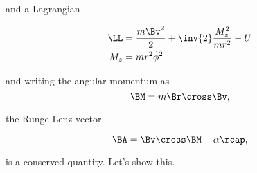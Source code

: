 and a Lagrangian

\begin{align}\label{eqn:RungeLenz:n}
\LL &= \frac{m \Bv^2}{2} + \inv{2} \frac{M_z^2}{m r^2} - U \\
M_z &= m r^2 \dot{\phi}^2
\end{align}

and writing the angular momentum as
\begin{equation}\label{eqn:RungeLenz:n}
\BM = m \Br \cross \Bv,
\end{equation}

the Runge-Lenz vector

\begin{equation}\label{eqn:RungeLenz:n}
\BA = \Bv \cross \BM - \alpha \rcap,
\end{equation}

is a conserved quantity.  Let's show this.

\EndNoBibArticle
